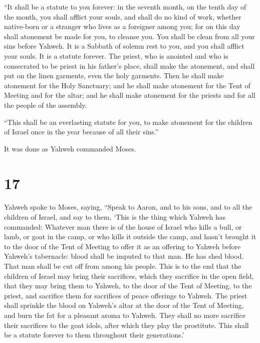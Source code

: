  ``It shall be a statute to you forever: in the seventh
month, on the tenth day of the month, you shall afflict your souls, and
shall do no kind of work, whether native-born or a stranger who lives as
a foreigner among you;  for on this day shall atonement be
made for you, to cleanse you. You shall be clean from all your sins
before Yahweh.  It is a Sabbath of solemn rest to you, and
you shall afflict your souls. It is a statute forever.  The
priest, who is anointed and who is consecrated to be priest in his
father's place, shall make the atonement, and shall put on the linen
garments, even the holy garments.  Then he shall make
atonement for the Holy Sanctuary; and he shall make atonement for the
Tent of Meeting and for the altar; and he shall make atonement for the
priests and for all the people of the assembly.

 ``This shall be an everlasting statute for you, to make
atonement for the children of Israel once in the year because of all
their sins.''

It was done as Yahweh commanded Moses.

\hypertarget{section-16}{%
\section{17}\label{section-16}}

 Yahweh spoke to Moses, saying,  ``Speak to
Aaron, and to his sons, and to all the children of Israel, and say to
them, `This is the thing which Yahweh has commanded: 
Whatever man there is of the house of Israel who kills a bull, or lamb,
or goat in the camp, or who kills it outside the camp,  and
hasn't brought it to the door of the Tent of Meeting to offer it as an
offering to Yahweh before Yahweh's tabernacle: blood shall be imputed to
that man. He has shed blood. That man shall be cut off from among his
people.  This is to the end that the children of Israel may
bring their sacrifices, which they sacrifice in the open field, that
they may bring them to Yahweh, to the door of the Tent of Meeting, to
the priest, and sacrifice them for sacrifices of peace offerings to
Yahweh.  The priest shall sprinkle the blood on Yahweh's
altar at the door of the Tent of Meeting, and burn the fat for a
pleasant aroma to Yahweh.  They shall no more sacrifice
their sacrifices to the goat idols, after which they play the
prostitute. This shall be a statute forever to them throughout their
generations.'

